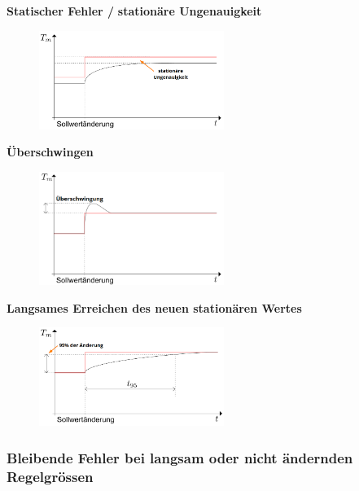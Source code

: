 \documentclass[
  10pt,
  a4paper,
  twocolumn]{article}
\numberwithin{equation}{section}
\begin{document}
\textbf{Statischer Fehler /} \textbf{stationäre Ungenauigkeit}

\begin{figure}[H]

{\centering \includegraphics[width=6cm,height=\textheight]{images/fuhrungsverhalten/stationary.png}

}

\end{figure}

\textbf{Überschwingen}

\begin{figure}[H]

{\centering \includegraphics[width=6cm,height=\textheight]{images/fuhrungsverhalten/uberschwingung.png}

}

\end{figure}

\textbf{Langsames Erreichen des neuen stationären Wertes}

\begin{figure}[H]

{\centering \includegraphics[width=6cm,height=\textheight]{images/fuhrungsverhalten/slow.png}

}

\end{figure}

\hypertarget{bleibende-fehler-bei-langsam-oder-nicht-uxe4ndernden-regelgruxf6ssen}{%
\subsubsection{Bleibende Fehler bei langsam oder nicht ändernden
Regelgrössen}\label{bleibende-fehler-bei-langsam-oder-nicht-uxe4ndernden-regelgruxf6ssen}}
\end{document}

